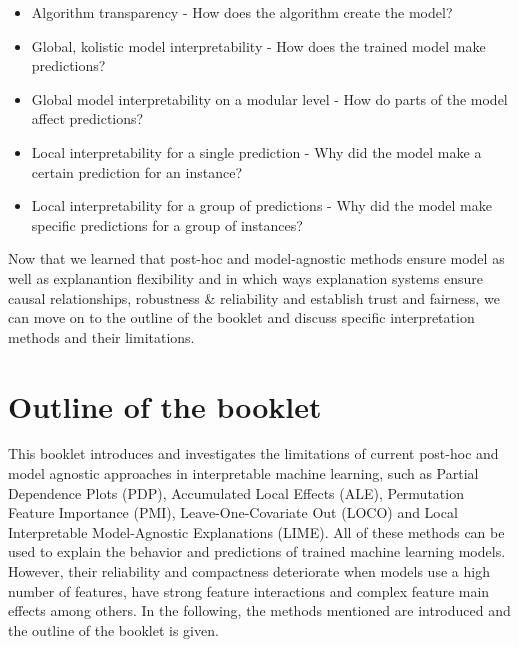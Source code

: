 \documentclass[]{krantz}
\providecommand{\tightlist}{%
  \setlength{\itemsep}{0pt}\setlength{\parskip}{0pt}}
\begin{document}
\begin{itemize}
\tightlist
\item
  Algorithm transparency - How does the algorithm create the model?
\item
  Global, kolistic model interpretability - How does the trained model
  make predictions?
\item
  Global model interpretability on a modular level - How do parts of the
  model affect predictions?
\item
  Local interpretability for a single prediction - Why did the model
  make a certain prediction for an instance?
\item
  Local interpretability for a group of predictions - Why did the model
  make specific predictions for a group of instances?
\end{itemize}

Now that we learned that post-hoc and model-agnostic methods ensure
model as well as explanantion flexibility and in which ways explanation
systems ensure causal relationships, robustness \& reliability and
establish trust and fairness, we can move on to the outline of the
booklet and discuss specific interpretation methods and their
limitations.

\section{Outline of the booklet}\label{outline-of-the-booklet}

This booklet introduces and investigates the limitations of current
post-hoc and model agnostic approaches in interpretable machine
learning, such as Partial Dependence Plots (PDP), Accumulated Local
Effects (ALE), Permutation Feature Importance (PMI), Leave-One-Covariate
Out (LOCO) and Local Interpretable Model-Agnostic Explanations (LIME).
All of these methods can be used to explain the behavior and predictions
of trained machine learning models. However, their reliability and
compactness deteriorate when models use a high number of features, have
strong feature interactions and complex feature main effects among
others. In the following, the methods mentioned are introduced and the
outline of the booklet is given.
\end{document}
